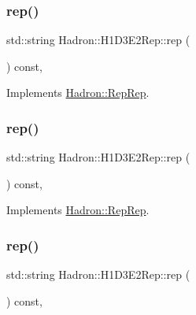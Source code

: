 \subsubsection{\texorpdfstring{rep()}{rep()}\hspace{0.1cm}{\footnotesize\ttfamily [2/5]}}
{\footnotesize\ttfamily std\+::string Hadron\+::\+H1\+D3\+E2\+Rep\+::rep (\begin{DoxyParamCaption}{ }\end{DoxyParamCaption}) const\hspace{0.3cm}{\ttfamily [inline]}, {\ttfamily [virtual]}}



Implements \mbox{\hyperlink{structHadron_1_1RepRep_ab3213025f6de249f7095892109575fde}{Hadron\+::\+Rep\+Rep}}.

\mbox{\label{structHadron_1_1H1D3E2Rep_ace031c7809b792a43f41c55b6b45c355}} 
\subsubsection{\texorpdfstring{rep()}{rep()}\hspace{0.1cm}{\footnotesize\ttfamily [3/5]}}
{\footnotesize\ttfamily std\+::string Hadron\+::\+H1\+D3\+E2\+Rep\+::rep (\begin{DoxyParamCaption}{ }\end{DoxyParamCaption}) const\hspace{0.3cm}{\ttfamily [inline]}, {\ttfamily [virtual]}}



Implements \mbox{\hyperlink{structHadron_1_1RepRep_ab3213025f6de249f7095892109575fde}{Hadron\+::\+Rep\+Rep}}.

\mbox{\label{structHadron_1_1H1D3E2Rep_ace031c7809b792a43f41c55b6b45c355}} 
\subsubsection{\texorpdfstring{rep()}{rep()}\hspace{0.1cm}{\footnotesize\ttfamily [4/5]}}
{\footnotesize\ttfamily std\+::string Hadron\+::\+H1\+D3\+E2\+Rep\+::rep (\begin{DoxyParamCaption}{ }\end{DoxyParamCaption}) const\hspace{0.3cm}{\ttfamily [inline]}, {\ttfamily [virtual]}}



